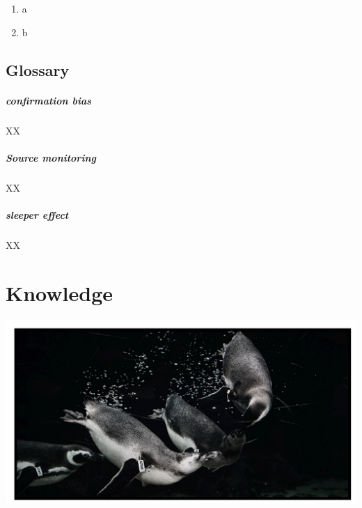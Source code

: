 \documentclass[
]{krantz}
\providecommand{\tightlist}{%
  \setlength{\itemsep}{0pt}\setlength{\parskip}{0pt}}
\begin{document}
\begin{enumerate}
\def\labelenumi{\arabic{enumi}.}
\tightlist
\item
  a
\item
  b
\end{enumerate}

\hypertarget{glossary-5}{%
\section{Glossary}\label{glossary-5}}

\hypertarget{confirmation-bias}{%
\paragraph*{confirmation bias}\label{confirmation-bias}}

XX

\hypertarget{source-monitoring-1}{%
\paragraph*{Source monitoring}\label{source-monitoring-1}}

XX

\hypertarget{sleeper-effect}{%
\paragraph*{sleeper effect}\label{sleeper-effect}}

XX

\hypertarget{knowledge}{%
\chapter{Knowledge}\label{knowledge}}

\begin{center}\includegraphics[width=1\linewidth]{images/ch7/cover-penguins} \end{center}
\end{document}
